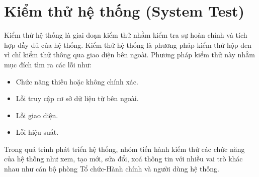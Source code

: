\section{Kiểm thử hệ thống (System Test)}
Kiểm thử hệ thống là giai đoạn kiểm thử nhằm kiểm tra sự hoàn chỉnh và tích hợp đầy đủ của hệ thống. Kiểm thử hệ thống là phương pháp kiểm thử hộp đen vì chỉ kiểm thử thông qua giao diện bên ngoài. Phương pháp kiểm thử này nhằm mục đích tìm ra các lỗi như:
\begin{itemize}
    \item Chức năng thiếu hoặc không chính xác.
    \item Lỗi truy cập cơ sở dữ liệu từ bên ngoài.
    \item Lỗi giao diện.
    \item Lỗi hiệu suất.
\end{itemize}
Trong quá trình phát triển hệ thống, nhóm tiến hành kiểm thử các chức năng của hệ thống như xem, tạo mới, sửa đổi, xoá thông tin với nhiều vai trò khác nhau như cán bộ phòng Tổ chức-Hành chính và người dùng hệ thống.

